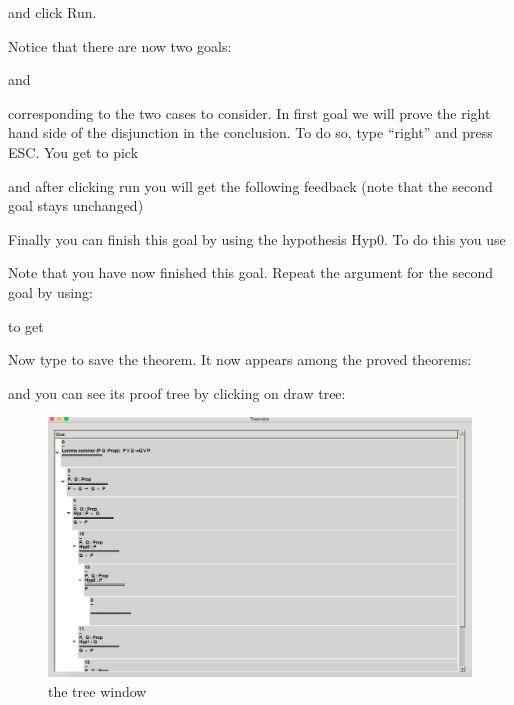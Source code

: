 and click Run.

Notice that there are now two goals:

and 


corresponding to the two cases to consider. In first goal we will prove the right hand side of the disjunction in the conclusion. To do so, type ``right'' and press ESC. You get to pick


and after clicking run you will get the following feedback (note that the second goal stays unchanged)


Finally you can finish this goal by using the hypothesis Hyp0. To do this you use

Note that you have now finished this goal. Repeat the argument for the second goal by using:


to get 

Now type
to save the theorem. It now appears among the proved theorems:

and you can see its proof tree by clicking on draw tree:


\begin{figure}[h!]
\includegraphics[scale=0.3]{Installation/treecommor.png}
\caption{the tree window}\label{treesearch}
\end{figure}

